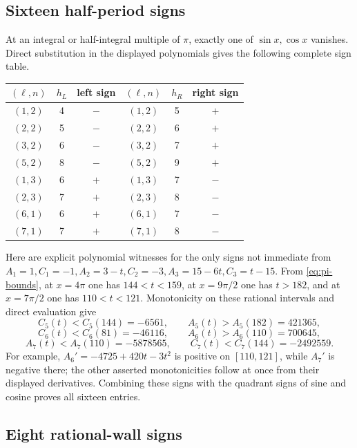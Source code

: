 \documentclass[11pt]{article}
\begin{document}
\subsection{Sixteen half-period signs}

At an integral or half-integral multiple of \(\pi\), exactly one of
\(\sin x,\cos x\) vanishes.  Direct substitution in the displayed
polynomials gives the following complete sign table.
\begin{center}
\small
\begin{tabular}{c|c|c@{\qquad}c|c|c}
\toprule
\((\ell,n)\)&\(h_L\)&left sign&\((\ell,n)\)&\(h_R\)&right sign\\
\midrule
\((1,2)\)&4&\(-\)&\((1,2)\)&5&\(+\)\\
\((2,2)\)&5&\(-\)&\((2,2)\)&6&\(+\)\\
\((3,2)\)&6&\(-\)&\((3,2)\)&7&\(+\)\\
\((5,2)\)&8&\(-\)&\((5,2)\)&9&\(+\)\\
\((1,3)\)&6&\(+\)&\((1,3)\)&7&\(-\)\\
\((2,3)\)&7&\(+\)&\((2,3)\)&8&\(-\)\\
\((6,1)\)&6&\(+\)&\((6,1)\)&7&\(-\)\\
\((7,1)\)&7&\(+\)&\((7,1)\)&8&\(-\)\\
\bottomrule
\end{tabular}
\end{center}
Here are explicit polynomial witnesses for the only signs not immediate
from \(A_1=1,C_1=-1,A_2=3-t,C_2=-3,A_3=15-6t,C_3=t-15\).
From \eqref{eq:pi-bounds}, at \(x=4\pi\) one has
\(144<t<159\), at \(x=9\pi/2\) one has \(t>182\), and at
\(x=7\pi/2\) one has \(110<t<121\).  Monotonicity on these rational
intervals and direct evaluation give
\[
 C_5(t)<C_5(144)=-6561,\qquad
 A_5(t)>A_5(182)=421365,
\]
\[
 C_6(t)<C_6(81)=-46116,\qquad
 A_6(t)>A_6(110)=700645,
\]
\[
 A_7(t)<A_7(110)=-5878565,\qquad
 C_7(t)<C_7(144)=-2492559.
\]
For example, \(A_6'=-4725+420t-3t^2\) is positive on
\([110,121]\), while \(A_7'\) is negative there; the other asserted
monotonicities follow at once from their displayed derivatives.  Combining
these signs with the quadrant signs of sine and cosine proves all sixteen
entries.

\subsection{Eight rational-wall signs}
\end{document}
